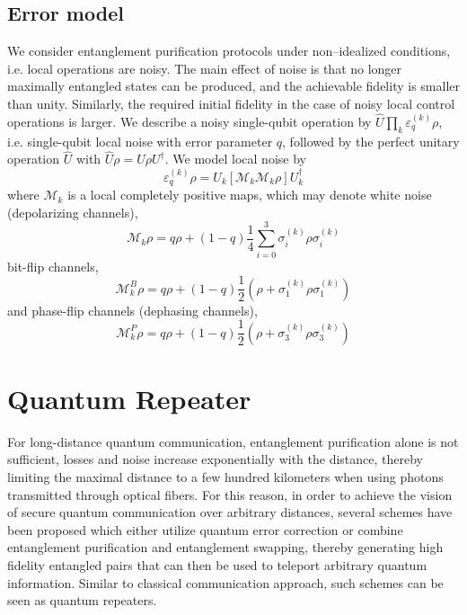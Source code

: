 \documentclass[10pt,a4paper]{book}
\numberwithin{equation}{chapter}
\numberwithin{figure}{chapter}
\numberwithin{table}{chapter}
\begin{document}
\subsection{Error model}
We consider entanglement purification protocols under non–idealized conditions, i.e. local operations are noisy. The main effect of noise is that no longer maximally entangled states can be produced, and the achievable fidelity is smaller than unity. Similarly, the required initial fidelity in the case of noisy local control operations is larger. We describe a noisy single-qubit operation by $\hat{U}\prod_{k}\varepsilon^{(k)}_{q}\rho$, i.e. single-qubit local noise with error parameter $q$, followed by the perfect unitary operation $\hat{U}$ with $\hat{U}\rho = U \rho U^{\dagger}$. We model local noise by
\begin{equation}
\varepsilon^{(k)}_{q}\rho = U_{k} [\mathcal{M}_k \mathcal{M}_k \rho]U^{\dagger}_{k}
\end{equation}
where $\mathcal{M}_k$ is a local completely positive maps, which may denote white noise (depolarizing channels),
\begin{equation}
\mathcal{M}_k \rho = q\rho + (1-q)\frac{1}{4}\sum^{3}_{i=0}\sigma^{(k)}_{i}\rho \sigma^{(k)}_{i}
\end{equation}
bit-flip channels,
\begin{equation}
\mathcal{M}^{B}_k \rho = q\rho +(1-q)\frac{1}{2}(\rho +\sigma^{(k)}_{1}\rho \sigma^{(k)}_{1} )
\end{equation}
and phase-flip channels (dephasing channels),
\begin{equation}
\mathcal{M}^{P}_k \rho = q\rho +(1-q)\frac{1}{2}(\rho +\sigma^{(k)}_{3}\rho \sigma^{(k)}_{3} )
\end{equation}

\section{Quantum Repeater}

For long-distance quantum communication, entanglement purification alone is not sufficient, losses and noise increase exponentially with the distance, thereby limiting the maximal distance to a few hundred kilometers when using photons transmitted through optical fibers. For this reason, in order to achieve the vision of secure quantum communication over arbitrary distances, several schemes have been proposed 
which either utilize quantum error correction or combine entanglement purification and entanglement swapping, thereby generating high fidelity entangled pairs that can then be used to teleport arbitrary quantum information. Similar to classical communication approach, such schemes can be seen as quantum repeaters. 
\end{document}
